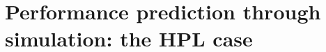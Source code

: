 \chapter{Performance prediction through simulation: the HPL case}
\label{chapter:introduction}

\lipsum[1]
